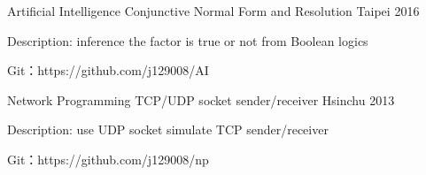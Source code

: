 
\begin{cventries}

  \cventry
    {Artificial Intelligence}
    {Conjunctive Normal Form and Resolution}
    {Taipei} %
    {2016} %
    {
      \begin{cvitems} %
        \item {Description: inference the factor is true or not from Boolean logics}
        \item {Git：https://github.com/j129008/AI}
      \end{cvitems}
    }


  \cventry
    {Network Programming}
    {TCP/UDP socket sender/receiver}
    {Hsinchu} %
    {2013} %
    {
      \begin{cvitems} %
        \item {Description: use UDP socket simulate TCP sender/receiver}
        \item {Git：https://github.com/j129008/np}
      \end{cvitems}
    }

\end{cventries}
